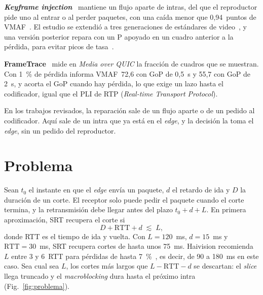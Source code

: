 \documentclass[10pt,twocolumn,letterpaper]{article}
\begin{document}
\textbf{\emph{Keyframe injection}}~\cite{vanwallendael2021,mareen2024} mantiene un flujo aparte de intras, del que el reproductor pide uno al entrar o al perder paquetes, con una caída menor que 0,94~puntos de VMAF~\cite{vanwallendael2021}. El estudio se extendió a tres generaciones de estándares de video~\cite{mareen2024}, y una versión posterior repara con un P apoyado en un cuadro anterior a la pérdida, para evitar picos de tasa~\cite{mareen2023}.

\textbf{FrameTrace}~\cite{frametrace} mide en \emph{Media over QUIC} la fracción de cuadros que se muestran. Con 1~\% de pérdida informa VMAF~72,6 con GoP de 0,5~s y 55,7 con GoP de 2~s, y acorta el GoP cuando hay pérdida, lo que exige un lazo hasta el codificador, igual que el PLI de RTP (\emph{Real-time Transport Protocol}).

En los trabajos revisados, la reparación sale de un flujo aparte o de un pedido al codificador. Aquí sale de un intra que ya está en el \emph{edge}, y la decisión la toma el \emph{edge}, sin un pedido del reproductor.

\section{Problema}
\label{sec:problema}

Sean $t_0$ el instante en que el \emph{edge} envía un paquete, $d$ el retardo de ida y $D$ la duración de un corte. El receptor solo puede pedir el paquete cuando el corte termina, y la retransmisión debe llegar antes del plazo $t_0+d+L$. En primera aproximación, SRT recupera el corte si
\begin{equation}
D + \mathrm{RTT} + d \;\lesssim\; L ,
\label{eq:cond}
\end{equation}
donde RTT es el tiempo de ida y vuelta. Con $L=120$~ms, $d=15$~ms y $\mathrm{RTT}=30$~ms, SRT recupera cortes de hasta unos 75~ms. Haivision recomienda $L$ entre 3 y 6~RTT para pérdidas de hasta 7~\%~\cite{haivision}, es decir, de 90 a 180~ms en este caso. Sea cual sea $L$, los cortes más largos que $L-\mathrm{RTT}-d$ se descartan: el \emph{slice} llega truncado y el \emph{macroblocking} dura hasta el próximo intra (Fig.~\ref{fig:problema}).
\end{document}
